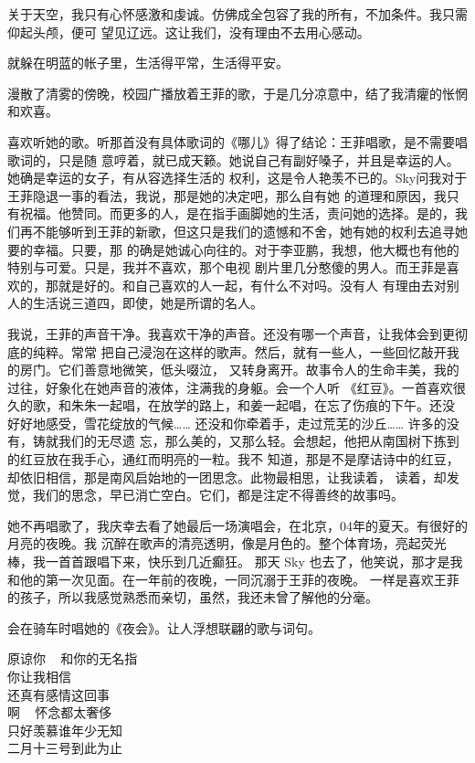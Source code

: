 		关于天空，我只有心怀感激和虔诚。仿佛成全包容了我的所有，不加条件。我只需仰起头颅，便可
	望见辽远。这让我们，没有理由不去用心感动。


		就躲在明蓝的帐子里，生活得平常，生活得平安。

	\endwriting



		漫散了清雾的傍晚，校园广播放着王菲的歌，于是几分凉意中，结了我清癯的怅惘和欢喜。

		喜欢听她的歌。听那首没有具体歌词的《哪儿》得了结论：王菲唱歌，是不需要唱歌词的，只是随
	意哼着，就已成天籁。她说自己有副好嗓子，并且是幸运的人。她确是幸运的女子，有从容选择生活的
	权利，这是令人艳羡不已的。Sky问我对于王菲隐退一事的看法，我说，那是她的决定吧，那么自有她
	的道理和原因，我只有祝福。他赞同。而更多的人，是在指手画脚她的生活，责问她的选择。是的，我
	们再不能够听到王菲的新歌，但这只是我们的遗憾和不舍，她有她的权利去追寻她要的幸福。只要，那
	的确是她诚心向往的。对于李亚鹏，我想，他大概也有他的特别与可爱。只是，我并不喜欢，那个电视
	剧片里几分憨傻的男人。而王菲是喜欢的，那就是好的。和自己喜欢的人一起，有什么不对吗。没有人
	有理由去对别人的生活说三道四，即使，她是所谓的名人。

		我说，王菲的声音干净。我喜欢干净的声音。还没有哪一个声音，让我体会到更彻底的纯粹。常常
	把自己浸泡在这样的歌声。然后，就有一些人，一些回忆敲开我的房门。它们善意地微笑，低头啜泣，
	又转身离开。故事令人的生命丰美，我的过往，好象化在她声音的液体，注满我的身躯。会一个人听
	《红豆》。一首喜欢很久的歌，和朱朱一起唱，在放学的路上，和姜一起唱，在忘了伤痕的下午。还没
	好好地感受，雪花绽放的气候…… 还没和你牵着手，走过荒芜的沙丘…… 许多的没有，铸就我们的无尽遗
	忘，那么美的，又那么轻。会想起，他把从南国树下拣到的红豆放在我手心，通红而明亮的一粒。我不
	知道，那是不是摩诘诗中的红豆，却依旧相信，那是南风启始地的一团思念。此物最相思，让我读着，
	读着，却发觉，我们的思念，早已消亡空白。它们，都是注定不得善终的故事吗。

		她不再唱歌了，我庆幸去看了她最后一场演唱会，在北京，04年的夏天。有很好的月亮的夜晚。我
	沉醉在歌声的清亮透明，像是月色的。整个体育场，亮起荧光棒，我一首首跟唱下来，快乐到几近癫狂。
	那天 Sky 也去了，他笑说，那才是我和他的第一次见面。在一年前的夜晚，一同沉溺于王菲的夜晚。
	一样是喜欢王菲的孩子，所以我感觉熟悉而亲切，虽然，我还未曾了解他的分毫。

		会在骑车时唱她的《夜会》。让人浮想联翩的歌与词句。

		\longpoem{}{}{}
			原谅你 ~ 和你的无名指 \\
			你让我相信 \\
			还真有感情这回事 \\
			啊 ~ 怀念都太奢侈 \\
			只好羡慕谁年少无知 \\
			二月十三号到此为止
		\endlongpoem


